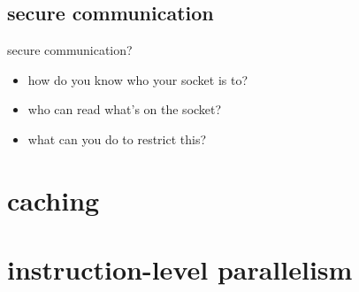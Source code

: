 

\subsection{secure communication}

\begin{frame}{secure communication?}
    \begin{itemize}
    \item how do you know who your socket is to?
    \item who can read what's on the socket?
    \item what can you do to restrict this?
    \end{itemize}
\end{frame}

\section{caching}




\section{instruction-level parallelism}



